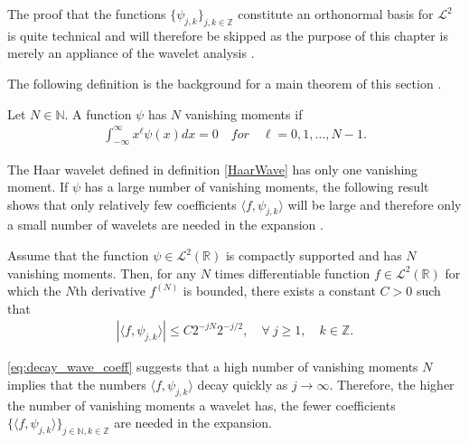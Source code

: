 The proof that the functions $\{\psi_{j,k}\}_{j,k\in\mathbb{Z}}$ constitute an orthonormal basis for $\mathcal{L}^2$ is quite technical and will therefore be skipped as the purpose of this chapter is merely an appliance of the wavelet analysis \cite{page 161, FSE2010} .

The following definition is the background for a main theorem of this section \cite{page 170, FSE2010}.

\begin{definition}
Let $N \in \mathbb{N}$. A function $\psi$ has $N$ vanishing moments if
\begin{align*}
\int_{-\infty}^\infty x^\ell \psi(x) dx = 0 \quad for \quad \ell = 0, 1, \dots, N-1.
\end{align*}
\end{definition}

The Haar wavelet defined in definition \ref{HaarWave} has only one vanishing moment. If $\psi$ has a large number of vanishing moments, the following result shows that only relatively few coefficients $\langle f, \psi_{j,k} \rangle$ will be large and therefore only a small number of wavelets are needed in the expansion .

\begin{theorem}
Assume that the function $\psi \in \mathcal{L}^2(\mathbb{R})$ is compactly supported and has $N$ vanishing moments. Then, for any $N$ times differentiable function $f \in \mathcal{L}^2(\mathbb{R})$ for which the $N$th derivative $f^{(N)}$ is bounded, there exists a constant $C > 0$ such that
\begin{align} \label{eq:decay_wave_coeff}
|\langle f, \psi_{j,k} \rangle| \leq C 2^{-jN} 2^{-j/2}, \quad \forall \ j \geq 1, \quad k \in \mathbb{Z}.
\end{align}
\end{theorem}

\eqref{eq:decay_wave_coeff} suggests that a high number of vanishing moments $N$ implies that the numbers $\langle f, \psi_{j,k} \rangle$ decay quickly as $j \to \infty$. Therefore, the higher the number of vanishing moments a wavelet has, the fewer coefficients $\{ \langle f, \psi_{j,k} \rangle \}_{j\in\mathbb{N},k\in\mathbb{Z}}$ are needed in the expansion.